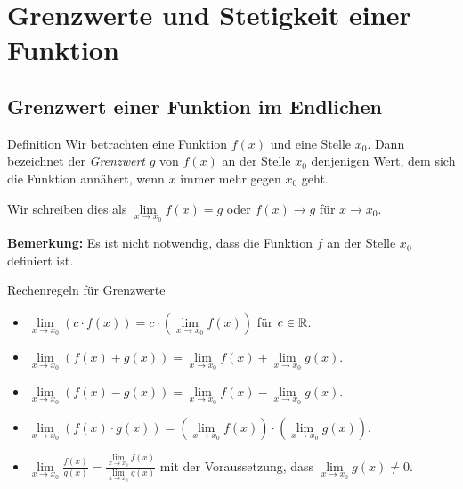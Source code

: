 \section{Grenzwerte und Stetigkeit einer Funktion}\label{sec:grenzwerte-und-stetigkeit}

\subsection{Grenzwert einer Funktion im Endlichen}\label{subsec:grenzwert-funktion-im-endlichen}

\begin{definition}{Definition}
    Wir betrachten eine Funktion $f(x)$ und eine Stelle $x_0$.
    Dann bezeichnet der \emph{Grenzwert} $g$ von $f(x)$ an der Stelle $x_0$ denjenigen Wert, dem sich die Funktion annähert, wenn $x$ immer mehr gegen $x_{0}$ geht.

    Wir schreiben dies als $\lim \limits_{x \rightarrow x_0} f(x) = g$ oder $f(x) \rightarrow g$ für $x \rightarrow x_0$.
\end{definition}

\textbf{Bemerkung:} Es ist nicht notwendig, dass die Funktion $f$ an der Stelle $x_0$ definiert ist.

\begin{definition}{Rechenregeln für Grenzwerte}
    \begin{itemize}
        \item $\lim \limits_{x \rightarrow x_0} (c \cdot f(x)) = c \cdot \left( \lim \limits_{x \rightarrow x_0} f(x) \right)$ für $c \in \mathbb{R}$.
        \item $\lim \limits_{x \rightarrow x_0} (f(x) + g(x)) = \lim \limits_{x \rightarrow x_0} f(x) + \lim \limits_{x \rightarrow x_0} g(x)$.
        \item $\lim \limits_{x \rightarrow x_0} (f(x) - g(x)) = \lim \limits_{x \rightarrow x_0} f(x) - \lim \limits_{x \rightarrow x_0} g(x)$.
        \item $\lim \limits_{x \rightarrow x_0} (f(x) \cdot g(x)) = \left( \lim \limits_{x \rightarrow x_0} f(x) \right) \cdot \left( \lim \limits_{x \rightarrow x_0} g(x) \right)$.
        \item $\lim \limits_{x \rightarrow x_0} \frac{f(x)}{g(x)} = \frac{\lim \limits_{x \rightarrow x_0} f(x)}{\lim \limits_{x \rightarrow x_0} g(x)}$ mit der Voraussetzung, dass $\lim \limits_{x \rightarrow x_0} g(x) \neq 0$.
    \end{itemize}
\end{definition}


